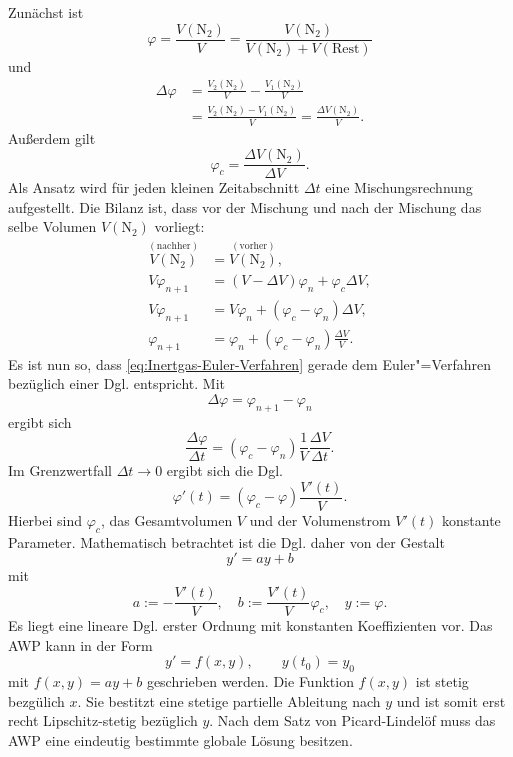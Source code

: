 \documentclass[a4paper,11pt,fleqn,twocolumn,twoside,dvipdfmx]{scrartcl}
\numberwithin{equation}{section}
\begin{document}
Zunächst ist
\begin{equation}
\varphi = \frac{V(\mathrm{N_2})}{V}
= \frac{V(\mathrm{N_2})}{V(\mathrm{N_2})+V(\mathrm{Rest})}
\end{equation}
und
\begin{equation}
\begin{split}
\Delta\varphi &= \frac{V_2(\mathrm{N_2})}{V}-\frac{V_1(\mathrm{N_2})}{V}\\
&= \frac{V_2(\mathrm{N_2})-V_1(\mathrm{N_2})}{V} = \frac{\Delta V(\mathrm{N_2})}{V}.
\end{split}
\end{equation}
Außerdem gilt
\begin{equation}
\varphi_c = \frac{\Delta V(\mathrm{N_2})}{\Delta V}.
\end{equation}
Als Ansatz wird für jeden kleinen Zeitabschnitt $\Delta t$ eine
Mischungsrechnung aufgestellt. Die Bilanz ist, dass vor der
Mischung und nach der Mischung das selbe Volumen $V(\mathrm{N_2})$
vorliegt:
\begin{align}
\overset{(\mathrm{nachher})}{V(\mathrm{N_2})} &= \overset{(\mathrm{vorher})}{V(\mathrm{N_2})},\\
\label{eq:Intertgas-Differenzengleichung}
V\varphi_{n+1} &= (V-\Delta V)\varphi_n +\varphi_c\Delta V,\\
V\varphi_{n+1} &= V\varphi_n+(\varphi_c-\varphi_n)\Delta V,\\
\label{eq:Inertgas-Euler-Verfahren}
\varphi_{n+1} &= \varphi_n+(\varphi_c-\varphi_n)\frac{\Delta V}{V}.
\end{align}
Es ist nun so, dass \eqref{eq:Inertgas-Euler-Verfahren} gerade
dem Euler"=Verfahren bezüglich einer Dgl. entspricht. Mit
\begin{equation}
\Delta\varphi = \varphi_{n+1}-\varphi_{n}
\end{equation}
ergibt sich
\begin{equation}
\frac{\Delta\varphi}{\Delta t} = (\varphi_c-\varphi_n)\frac{1}{V}\frac{\Delta V}{\Delta t}.
\end{equation}
Im Grenzwertfall $\Delta t\to 0$ ergibt sich die Dgl.
\begin{equation}
\varphi'(t) = (\varphi_c-\varphi)\frac{V'(t)}{V}.
\end{equation}
Hierbei sind $\varphi_c$, das Gesamtvolumen $V$ und der
Volumenstrom $V'(t)$ konstante Parameter.
Mathematisch betrachtet ist die Dgl. daher von der Gestalt
\begin{equation}
y' = ay+b
\end{equation}
mit
\begin{equation}
a:=-\frac{V'(t)}{V},\quad b:=\frac{V'(t)}{V}\varphi_c,\quad y:=\varphi.
\end{equation}
Es liegt eine lineare Dgl. erster Ordnung mit konstanten
Koeffizienten vor. Das AWP kann in der Form
\begin{equation}
y' = f(x,y),\qquad y(t_0)=y_0
\end{equation}
mit $f(x,y)=ay+b$ geschrieben werden. Die Funktion $f(x,y)$
ist stetig bezgülich $x$. Sie bestitzt eine stetige partielle
Ableitung nach $y$ und ist somit erst recht Lipschitz-stetig
bezüglich $y$. Nach dem Satz von Picard-Lindelöf muss das AWP
eine eindeutig bestimmte globale Lösung besitzen.
\end{document}
